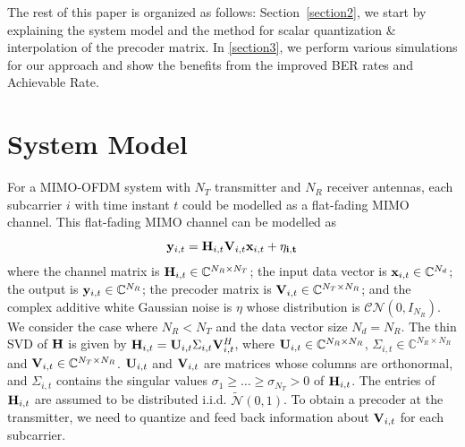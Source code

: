 \documentclass[conference]{IEEEtran}
\begin{document}
The rest of this paper is organized as follows: Section~\ref{section2}, we start by explaining the system model and the method for scalar quantization \& interpolation of the precoder matrix. In \ref{section3}, we perform various simulations for our approach and show the benefits from the improved BER rates and Achievable Rate.



\section{System Model}
For a MIMO-OFDM system with $N_T$ transmitter and $N_R$ receiver
antennas, each subcarrier $i$ with time instant $t$ could be modelled as a flat-fading MIMO channel. This flat-fading MIMO channel can be modelled as
\label{section2}
\begin{equation}
{\bf y}_{i,t} = {\bf H}_{i,t}{\bf V}_{i,t} {\bf x}_{i,t}+ \bf{\eta_{i,t}}
\end{equation}
where the channel matrix is
${\bf H}_{i,t} \in \mathbb{C}^{N_R \times N_T}$; the input data vector is
${\bf x}_{i,t} \in \mathbb{C}^{N_d}$; the output is
${\bf y}_{i,t} \in \mathbb{C}^{N_R}$; the precoder matrix is
${\bf V}_{i,t} \in \mathbb{C}^{N_T \times N_R}$; and the complex additive white
Gaussian noise is $\eta$ whose distribution is
${\mathcal{CN}}(0,I_{N_R})$. We consider the case where $N_R <
N_T$ and the data vector size $N_d = N_R$.
The thin SVD of ${\bf H}$ is given by
${\bf H}_{i,t} = {\bf U}_{i,t} \Sigma_{i,t} {\bf V}_{i,t}^{H}$, where
${\bf U}_{i,t} \in \mathbb{C}^{N_R \times N_R}$,
$\Sigma_{i,t} \in \mathbb{C}^{N_R \times N_R}$ and
${\bf V}_{i,t} \in \mathbb{C}^{N_T \times N_R}$. ${\bf U}_{i,t}$ and
${\bf V}_{i,t}$ are matrices whose columns are orthonormal, and
$\Sigma_{i,t}$ contains the singular values
$\sigma_1 \geq \ldots \geq \sigma_{N_T} > 0$ of ${\bf H}_{i,t}$. The
entries of ${\bf H}_{i,t}$ are assumed to be distributed
i.i.d. $\tilde{\mathcal{N}}(0,1)$. To obtain a precoder at the
transmitter, we need to quantize and feed back information about
${\bf V}_{i,t}$ for each subcarrier.
\end{document}
